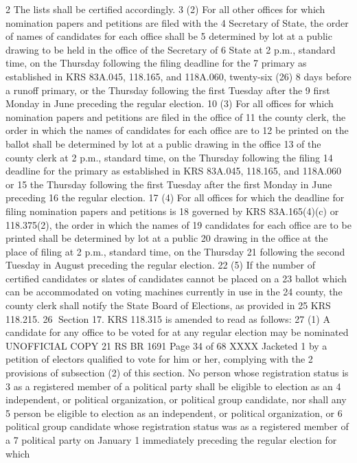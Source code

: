 2 The lists shall be certified accordingly.
3 (2) For all other offices for which nomination papers and petitions are filed with the
4 Secretary of State, the order of names of candidates for each office shall be
5 determined by lot at a public drawing to be held in the office of the Secretary of
6 State at 2 p.m., standard time, on the Thursday following the filing deadline for the
7 primary as established in KRS 83A.045, 118.165, and 118A.060, twenty-six (26)
8 days before a runoff primary, or the Thursday following the first Tuesday after the
9 first Monday in June preceding the regular election.
10 (3) For all offices for which nomination papers and petitions are filed in the office of
11 the county clerk, the order in which the names of candidates for each office are to
12 be printed on the ballot shall be determined by lot at a public drawing in the office
13 of the county clerk at 2 p.m., standard time, on the Thursday following the filing
14 deadline for the primary as established in KRS 83A.045, 118.165, and 118A.060 or
15 the Thursday following the first Tuesday after the first Monday in June preceding
16 the regular election.
17 (4) For all offices for which the deadline for filing nomination papers and petitions is
18 governed by KRS 83A.165(4)(c) or 118.375(2), the order in which the names of
19 candidates for each office are to be printed shall be determined by lot at a public
20 drawing in the office at the place of filing at 2 p.m., standard time, on the Thursday
21 following the second Tuesday in August preceding the regular election.
22 (5) If the number of certified candidates or slates of candidates cannot be placed on a
23 ballot which can be accommodated on voting machines currently in use in the
24 county, the county clerk shall notify the State Board of Elections, as provided in
25 KRS 118.215.
26 Section 17. KRS 118.315 is amended to read as follows:
27 (1) A candidate for any office to be voted for at any regular election may be nominated 
UNOFFICIAL COPY 21 RS BR 1691
Page 34 of 68
XXXX Jacketed
1 by a petition of electors qualified to vote for him or her, complying with the
2 provisions of subsection (2) of this section. No person whose registration status is
3 as a registered member of a political party shall be eligible to election as an
4 independent, or political organization, or political group candidate, nor shall any
5 person be eligible to election as an independent, or political organization, or
6 political group candidate whose registration status was as a registered member of a
7 political party on January 1 immediately preceding the regular election for which
